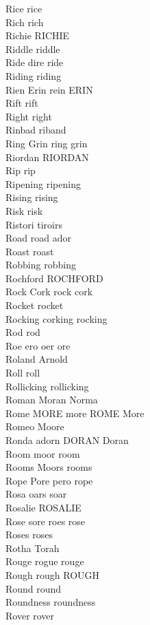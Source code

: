 Rice rice\\
Rich rich\\
Richie RICHIE\\
Riddle riddle\\
Ride dire ride\\
Riding riding\\
Rien Erin rein ERIN\\
Rift rift\\
Right right\\
Rinbad riband\\
Ring Grin ring grin\\
Riordan RIORDAN\\
Rip rip\\
Ripening ripening\\
Rising rising\\
Risk risk\\
Ristori tiroirs\\
Road road ador\\
Roast roast\\
Robbing robbing\\
Rochford ROCHFORD\\
Rock Cork rock cork\\
Rocket rocket\\
Rocking corking rocking\\
Rod rod\\
Roe ero oer ore\\
Roland Arnold\\
Roll roll\\
Rollicking rollicking\\
Roman Moran Norma\\
Rome MORE more ROME More\\
Romeo Moore\\
Ronda adorn DORAN Doran\\
Room moor room\\
Rooms Moors rooms\\
Rope Pore pero rope\\
Rosa oars soar\\
Rosalie ROSALIE\\
Rose sore roes rose\\
Roses roses\\
Rotha Torah\\
Rouge rogue rouge\\
Rough rough ROUGH\\
Round round\\
Roundness roundness\\
Rover rover\\
